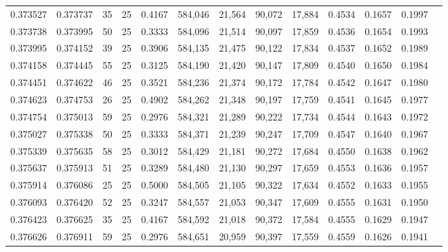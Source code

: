 \begin{tabular}{rrrrrrrrrrrrr}
0.373527 & 0.373737 &    35 &  25 &                                     0.4167 & 584,046 &  21,564 &  90,072 &  17,884 & 0.4534 & 0.1657 & 0.1997 \\
0.373738 & 0.373995 &    50 &  25 &                                     0.3333 & 584,096 &  21,514 &  90,097 &  17,859 & 0.4536 & 0.1654 & 0.1993 \\
0.373995 & 0.374152 &    39 &  25 &                                     0.3906 & 584,135 &  21,475 &  90,122 &  17,834 & 0.4537 & 0.1652 & 0.1989 \\
0.374158 & 0.374445 &    55 &  25 &                                     0.3125 & 584,190 &  21,420 &  90,147 &  17,809 & 0.4540 & 0.1650 & 0.1984 \\
0.374451 & 0.374622 &    46 &  25 &                                     0.3521 & 584,236 &  21,374 &  90,172 &  17,784 & 0.4542 & 0.1647 & 0.1980 \\
0.374623 & 0.374753 &    26 &  25 &                                     0.4902 & 584,262 &  21,348 &  90,197 &  17,759 & 0.4541 & 0.1645 & 0.1977 \\
0.374754 & 0.375013 &    59 &  25 &                                     0.2976 & 584,321 &  21,289 &  90,222 &  17,734 & 0.4544 & 0.1643 & 0.1972 \\
0.375027 & 0.375338 &    50 &  25 &                                     0.3333 & 584,371 &  21,239 &  90,247 &  17,709 & 0.4547 & 0.1640 & 0.1967 \\
0.375339 & 0.375635 &    58 &  25 &                                     0.3012 & 584,429 &  21,181 &  90,272 &  17,684 & 0.4550 & 0.1638 & 0.1962 \\
0.375637 & 0.375913 &    51 &  25 &                                     0.3289 & 584,480 &  21,130 &  90,297 &  17,659 & 0.4553 & 0.1636 & 0.1957 \\
0.375914 & 0.376086 &    25 &  25 &                                     0.5000 & 584,505 &  21,105 &  90,322 &  17,634 & 0.4552 & 0.1633 & 0.1955 \\
0.376093 & 0.376420 &    52 &  25 &                                     0.3247 & 584,557 &  21,053 &  90,347 &  17,609 & 0.4555 & 0.1631 & 0.1950 \\
0.376423 & 0.376625 &    35 &  25 &                                     0.4167 & 584,592 &  21,018 &  90,372 &  17,584 & 0.4555 & 0.1629 & 0.1947 \\
0.376626 & 0.376911 &    59 &  25 &                                     0.2976 & 584,651 &  20,959 &  90,397 &  17,559 & 0.4559 & 0.1626 & 0.1941 \\

\end{tabular}
